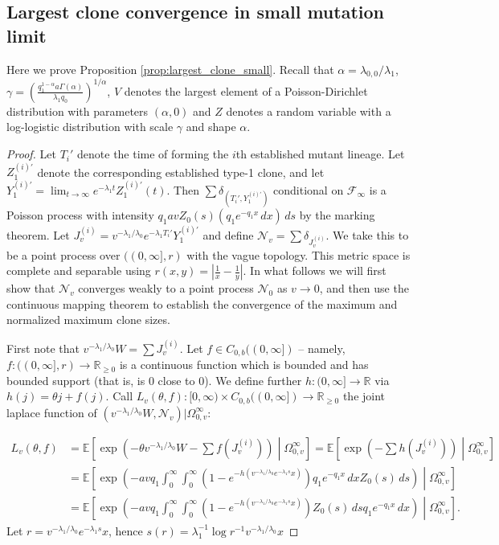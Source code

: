 \documentclass{article}
\numberwithin{equation}{section}
\begin{document}
\subsection{Largest clone convergence in small mutation limit}\label{app:largest_clone_small}
Here we prove Proposition \ref{prop:largest_clone_small}. Recall that  $\alpha=\lambda_{0,0}/\lambda_1$, $\gamma=\left(\frac{q_1^{1-\alpha}a\Gamma(\alpha)}{\lambda_1 q_0}\right)^{1/\alpha}$,  $V$ denotes the largest element of a Poisson-Dirichlet distribution with parameters $(\alpha,0)$ and $Z$ denotes a random variable with a log-logistic distribution with scale $\gamma$ and shape $\alpha$.
\LargestCloneSmall*
\begin{proof}
  Let $T_i'$ denote the time of forming the $i$th established mutant lineage. Let $Z_1^{(i)'}$ denote the corresponding established type-1 clone, and let $Y_1^{(i)'}=\lim_{t\to\infty}e^{-\lambda_1 t}Z_1^{(i)'}(t)$. Then $\sum \delta_{(T_i',Y_1^{(i)'})}$ conditional on $\mathcal{F}_\infty$ is a Poisson process with intensity $q_1 avZ_0(s)(q_1e^{-q_1 x}\,dx)\,ds$ by the marking theorem. Let $J_v^{(i)}=v^{-\lambda_1/\lambda_{0}}e^{-\lambda_1 T_i'}Y_1^{(i)'}$ and define $\mathcal{N}_v=\sum \delta_{J_v^{(i)}}$. We take this to be a point process over $((0,\infty],r)$ with the vague topology. This metric space is complete and separable using $r(x,y)=\left|\frac{1}{x}-\frac{1}{y}\right|$. In what follows we will first show that $\mathcal{N}_v$ converges weakly to a point process $\mathcal{N}_0$ as $v\to 0$, and then use the continuous mapping theorem to establish the convergence of the maximum and normalized maximum clone sizes. 
  
First note that $v^{-\lambda_1/\lambda_{0}}W=\sum J_v^{(i)}$. Let $f\in C_{0,b}((0,\infty])$ -- namely, $f:((0,\infty],r)\to \mathbb{R}_{\geq 0}$ is a continuous function which is bounded and has bounded support (that is, is $0$ close to $0$). We define further $h:(0,\infty]\to \mathbb{R}$ via $h(j)=\theta j+f(j)$. Call $L_v(\theta,f):[0,\infty)\times C_{0,b}((0,\infty])\to \mathbb{R}_{\geq 0}$ the joint laplace function of $(v^{-\lambda_1/\lambda_0}W,\mathcal{N}_v)|\Omega_{0,v}^\infty$:

\begin{align*}
  L_v(\theta,f)&=\mathbb{E}\left[\exp\left(-\theta v^{-\lambda_1/\lambda_{0}}W-\sum f(J_v^{(i)})\right)\middle| \Omega_{0,v}^\infty\right]=\mathbb{E}\left[\exp\left(-\sum h(J_v^{(i)})\right)\middle| \Omega_{0,v}^\infty\right]\\
  &=\mathbb{E}\left[\exp\left(-avq_1\int_0^\infty \int_0^\infty (1-e^{-h(v^{-\lambda_1/\lambda_0}e^{-\lambda_1 s}x)})q_1 e^{-q_1 x}\,dxZ_0(s)\,ds\right)\middle| \Omega_{0,v}^\infty\right]\\
  &=\mathbb{E}\left[\exp\left(-avq_1\int_0^\infty \int_0^\infty (1-e^{-h(v^{-\lambda_1/\lambda_0}e^{-\lambda_1 s}x)})Z_0(s)\,ds q_1 e^{-q_1 x}\,dx\right)\middle| \Omega_{0,v}^\infty\right].
\end{align*}
Let $r=v^{-\lambda_1/\lambda_0}e^{-\lambda_1 s}x$, hence $s(r)=\lambda_1^{-1}\log r^{-1}v^{-\lambda_1/\lambda_0}x$


\end{proof}
\end{document}
